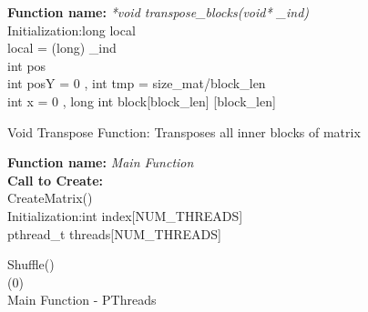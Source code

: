 \documentclass[10pt,journal]{article}
\begin{document}
\begin{algorithm}[H]
\SetAlgoLined
\textbf{Function name:} \emph{*void transpose\_blocks(void* \_ind)}\\\vspace{10pt}
Initialization\::long local\\
    local = (long) \_ind\\
    int pos\\
    int posY = 0 , int tmp = size\_mat/block\_len\\
    int x = 0 , long int block[block\_len] [block\_len]

\vspace{10pt} 

\caption{Void Transpose Function: Transposes all inner blocks of matrix}
\end{algorithm}

\begin{algorithm}[H]
\SetAlgoLined
\textbf{Function name:} \emph{Main Function}\\\vspace{10pt}
\textbf{Call to Create\::}\\
CreateMatrix()\\
Initialization\::int index[NUM\_THREADS]\\
pthread\_t threads[NUM\_THREADS]

\vspace{10pt} 

Shuffle()\\
\Return(0)\\

\caption{Main Function - PThreads}
\end{algorithm}
\end{document}
